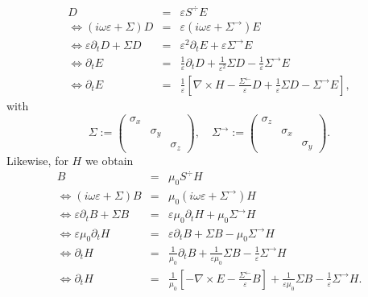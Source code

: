 \begin{eqnarray*}
  D & = & \varepsilon S^{\div} E\\
  \Leftrightarrow (i \omega \varepsilon + \Sigma) D & = & \varepsilon (i
  \omega \varepsilon + \Sigma^{\rightarrow}) E\\
  \Leftrightarrow \varepsilon \partial_t D + \Sigma D & = & \varepsilon^2
  \partial_t E + \varepsilon \Sigma^{\rightarrow} E\\
  \Leftrightarrow \partial_t E & = & \frac{1}{\varepsilon} \partial_t D +
  \frac{1}{\varepsilon^2} \Sigma D - \frac{1}{\varepsilon}
  \Sigma^{\rightarrow} E\\
  \Leftrightarrow \partial_t E & = & \frac{1}{\varepsilon} \left[ \nabla
  \times H - \frac{\Sigma^{\leftarrow}}{\varepsilon} D + \frac{1}{\varepsilon}
  \Sigma D - \Sigma^{\rightarrow} E \right],
\end{eqnarray*}
with
\[ \Sigma := \left(\begin{array}{ccc}
     \sigma_x &  & \\
     & \sigma_y & \\
     &  & \sigma_z
   \end{array}\right), \quad \Sigma^{\rightarrow} :=
   \left(\begin{array}{ccc}
     \sigma_z &  & \\
     & \sigma_x & \\
     &  & \sigma_y
   \end{array}\right) . \]
Likewise, for $H$ we obtain
\begin{eqnarray*}
  B & = & \mu_0 S^{\div} H\\
  \Leftrightarrow (i \omega \varepsilon + \Sigma) B & = & \mu_0 (i \omega
  \varepsilon + \Sigma^{\rightarrow}) H\\
  \Leftrightarrow \varepsilon \partial_t B + \Sigma B & = & \varepsilon \mu_0
  \partial_t H + \mu_0 \Sigma^{\rightarrow} H\\
  \Leftrightarrow \varepsilon \mu_0 \partial_t H & = & \varepsilon \partial_t
  B + \Sigma B - \mu_0 \Sigma^{\rightarrow} H\\
  \Leftrightarrow \partial_t H & = & \frac{1}{\mu_0} \partial_t B +
  \frac{1}{\varepsilon \mu_0} \Sigma B - \frac{1}{\varepsilon}
  \Sigma^{\rightarrow} H\\
  \Leftrightarrow \partial_t H & = & \frac{1}{\mu_0} \left[ - \nabla \times E
  - \frac{\Sigma^{\leftarrow}}{\varepsilon} B \right] + \frac{1}{\varepsilon
  \mu_0} \Sigma B - \frac{1}{\varepsilon} \Sigma^{\rightarrow} H.
\end{eqnarray*}
